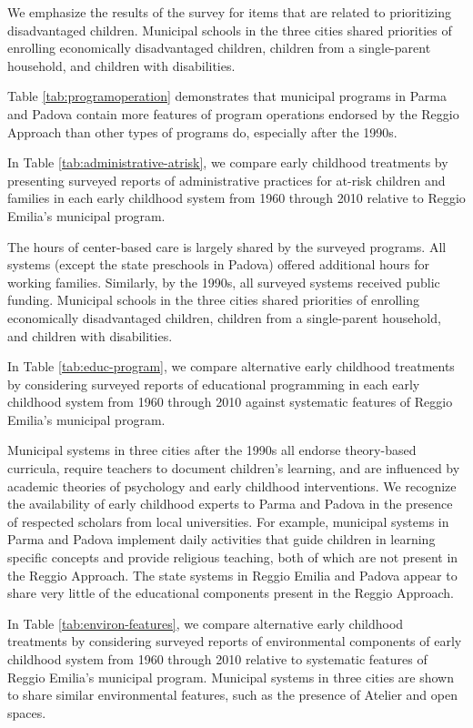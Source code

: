 We emphasize the results of the survey for items that are related to prioritizing disadvantaged children. Municipal schools in the three cities shared priorities of enrolling economically disadvantaged children, children from a single-parent household, and children with disabilities.

Table \ref{tab:programoperation} demonstrates that municipal programs in Parma and Padova contain more features of program operations endorsed by the Reggio Approach than other types of programs do, especially after the 1990s.

In Table \ref{tab:administrative-atrisk}, we compare early childhood treatments by presenting surveyed reports of administrative practices for at-risk children and families in each early childhood system from 1960 through 2010 relative to Reggio Emilia's municipal program.

The hours of center-based care is largely shared by the surveyed programs. All systems (except the state preschools in Padova) offered additional hours for working families. Similarly, by the 1990s, all surveyed systems received public funding. Municipal schools in the three cities shared priorities of enrolling economically disadvantaged children, children from a single-parent household, and children with disabilities.							

In Table \ref{tab:educ-program}, we compare alternative early childhood treatments by considering surveyed reports of educational programming in each early childhood system from 1960 through 2010 against systematic features of Reggio Emilia's municipal program.  

Municipal systems in three cities after the 1990s all endorse theory-based curricula, require teachers to document children's learning, and are influenced by academic theories of psychology and early childhood interventions. We recognize the availability of early childhood experts to Parma and Padova in the presence of respected scholars from local universities. For example, municipal systems in Parma and Padova implement daily activities that guide children in learning specific concepts and provide religious teaching, both of which are not present in the Reggio Approach. The state systems in Reggio Emilia and Padova appear to share very little of the educational components present in the Reggio Approach.												

In Table \ref{tab:environ-features}, we compare alternative early childhood treatments by considering surveyed reports of environmental components of early childhood system from 1960 through 2010 relative to systematic features of Reggio Emilia's municipal program. Municipal systems in three cities are shown to share similar environmental features, such as the presence of Atelier and open spaces.   
				
